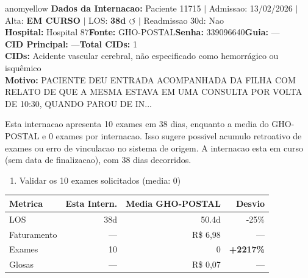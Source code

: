 \documentclass[a4paper,10pt]{article}
\begin{document}
\begin{anomalycard}[Internacao 11089 | GHO-POSTAL | MODERADO (z=2.94)]{anomyellow}
\textbf{Dados da Internacao:} Paciente 11715 $\mid$ Admissao: 13/02/2026 $\mid$ Alta: \textcolor{anomorange}{\textbf{EM CURSO}} $\mid$ LOS: \textbf{38d \textcolor{anomorange}{$\circlearrowleft$}} $\mid$ Readmissao 30d: Nao\\
\textbf{Hospital:} Hospital 87\quad\textbf{Fonte:} GHO-POSTAL\quad\textbf{Senha:} 339096640\quad\textbf{Guia:} ---\\
\textbf{CID Principal:} {\small ---}\quad\textbf{Total CIDs:} 1\\

\textbf{CIDs:} {\scriptsize Acidente vascular cerebral, não especificado como hemorrágico ou isquêmico}\\

\textbf{Motivo:} {\scriptsize PACIENTE DEU ENTRADA  ACOMPANHADA DA FILHA COM RELATO DE QUE A MESMA ESTAVA EM UMA CONSULTA POR VOLTA DE 10:30, QUANDO PAROU DE IN...}\\

\vspace{2pt}\begin{tcolorbox}[colback=severityred!20,colframe=anomyellow,title={\textbf{Interpretacao de Negocio}},fonttitle=\bfseries\small,left=4pt,right=4pt,top=3pt,bottom=3pt]
{\small Esta internacao apresenta 10 exames em 38 dias, enquanto a media do GHO-POSTAL e 0 exames por internacao. Isso sugere possivel acumulo retroativo de exames ou erro de vinculacao no sistema de origem. A internacao esta em curso (sem data de finalizacao), com 38 dias decorridos.}
\end{tcolorbox}
\begin{tcolorbox}[colback=severityyellow!30,colframe=anomorange,title={\textbf{Recomendacoes Especificas}},fonttitle=\bfseries\small,left=4pt,right=4pt,top=3pt,bottom=3pt]
\begin{enumerate}[nosep,leftmargin=16pt]
\item {\small Validar os 10 exames solicitados (media: 0)}
\end{enumerate}
\end{tcolorbox}
\begin{center}\begin{tabular}{l r r r}\toprule\textbf{Metrica} & \textbf{Esta Intern.} & \textbf{Media GHO-POSTAL} & \textbf{Desvio} \\\midrule
LOS & 38d & 50.4d & -25\% \\
Faturamento & --- & R\$ 6,98 & --- \\
Exames & 10 & 0 & \textcolor{anomred}{\textbf{+2217\%}} \\
Glosas & --- & R\$ 0,07 & --- \\
\bottomrule\end{tabular}\end{center}


\end{anomalycard}
\end{document}
